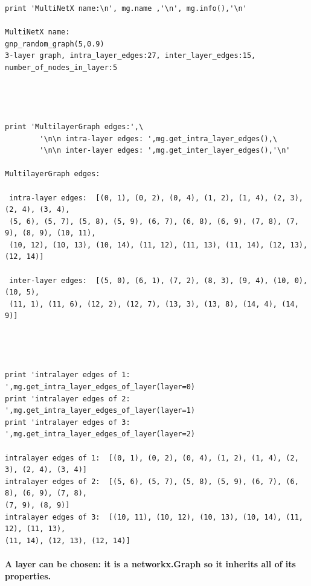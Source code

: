 \documentclass[11pt]{article}
\begin{document}
\begin{verbatim}
print 'MultiNetX name:\n', mg.name ,'\n', mg.info(),'\n'

MultiNetX name:
gnp_random_graph(5,0.9) 
3-layer graph, intra_layer_edges:27, inter_layer_edges:15, number_of_nodes_in_layer:5  




print 'MultilayerGraph edges:',\
        '\n\n intra-layer edges: ',mg.get_intra_layer_edges(),\
        '\n\n inter-layer edges: ',mg.get_inter_layer_edges(),'\n' 

MultilayerGraph edges: 

 intra-layer edges:  [(0, 1), (0, 2), (0, 4), (1, 2), (1, 4), (2, 3), (2, 4), (3, 4),
 (5, 6), (5, 7), (5, 8), (5, 9), (6, 7), (6, 8), (6, 9), (7, 8), (7, 9), (8, 9), (10, 11), 
 (10, 12), (10, 13), (10, 14), (11, 12), (11, 13), (11, 14), (12, 13), (12, 14)] 

 inter-layer edges:  [(5, 0), (6, 1), (7, 2), (8, 3), (9, 4), (10, 0), (10, 5),
 (11, 1), (11, 6), (12, 2), (12, 7), (13, 3), (13, 8), (14, 4), (14, 9)] 




print 'intralayer edges of 1: ',mg.get_intra_layer_edges_of_layer(layer=0)
print 'intralayer edges of 2: ',mg.get_intra_layer_edges_of_layer(layer=1)
print 'intralayer edges of 3: ',mg.get_intra_layer_edges_of_layer(layer=2)

intralayer edges of 1:  [(0, 1), (0, 2), (0, 4), (1, 2), (1, 4), (2, 3), (2, 4), (3, 4)]
intralayer edges of 2:  [(5, 6), (5, 7), (5, 8), (5, 9), (6, 7), (6, 8), (6, 9), (7, 8), 
(7, 9), (8, 9)]
intralayer edges of 3:  [(10, 11), (10, 12), (10, 13), (10, 14), (11, 12), (11, 13), 
(11, 14), (12, 13), (12, 14)]
\end{verbatim}

\paragraph{A layer can be chosen: it is a networkx.Graph so it inherits
all of its
properties.}\label{a-layer-can-be-chosen-it-is-a-networkx.graph-so-it-inherits-all-of-its-properties.}
\end{document}
